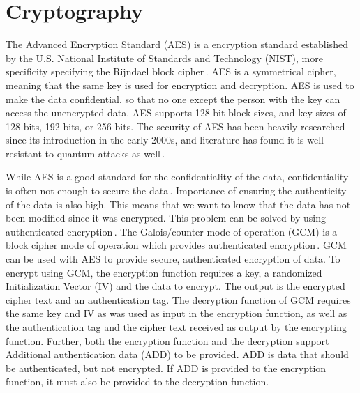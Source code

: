 \section{Cryptography}
\label{sec:back_crypto}
The Advanced Encryption Standard (AES) is a encryption standard established by the U.S. National Institute of Standards and Technology (NIST), more specificity specifying the Rijndael block cipher\,\cite{kumarvermaPerformanceAnalysisRC62012}. AES is a symmetrical cipher, meaning that the same key is used for encryption and decryption. AES is used to make the data confidential, so that no one except the person with the key can access the unencrypted data. AES supports 128-bit block sizes, and key sizes of 128 bits, 192 bits, or 256 bits. The security of AES has been heavily researched since its introduction in the early 2000s, and literature has found it is well resistant to quantum attacks as well\,\cite{bonnetainQuantumSecurityAnalysis2019}.

While AES is a good standard for the confidentiality of the data, confidentiality is often not enough to secure the data\,\cite{rosswallrabensteinWhenItComes2021}. Importance of ensuring the authenticity of the data is also high. This means that we want to know that the data has not been modified since it was encrypted. This problem can be solved by using authenticated encryption\,\cite{khovratovichAnswerWhyShould2013}. The Galois/counter mode of operation (GCM) is a block cipher mode of operation which provides authenticated encryption\,\cite{mcgrewGaloisCounterMode2004}. GCM can be used with AES to provide secure, authenticated encryption of data. To encrypt using GCM, the encryption function requires a key, a randomized Initialization Vector (IV) and the data to encrypt. The output is the encrypted cipher text and an authentication tag. The decryption function of GCM requires the same key and IV as was used as input in the encryption function, as well as the authentication tag and the cipher text received as output by the encrypting function. Further, both the encryption function and the decryption support Additional authentication data (ADD) to be provided. ADD is data that should be authenticated, but not encrypted. If ADD is provided to the encryption function, it must also be provided to the decryption function.

